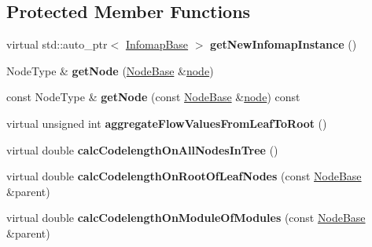 \subsection*{Protected Member Functions}
\begin{DoxyCompactItemize}
\item 
\mbox{\label{classInfomapGreedyCommon_aaaa423506d351f689fe1e2cf0092930c}} 
virtual std\+::auto\+\_\+ptr$<$ \mbox{\hyperlink{classInfomapBase}{Infomap\+Base}} $>$ {\bfseries get\+New\+Infomap\+Instance} ()
\item 
\mbox{\label{classInfomapGreedyCommon_ab6f3822e0e2a7d5bbbc00f52b2750222}} 
Node\+Type \& {\bfseries get\+Node} (\mbox{\hyperlink{classNodeBase}{Node\+Base}} \&\mbox{\hyperlink{structnode}{node}})
\item 
\mbox{\label{classInfomapGreedyCommon_a6e46fb6c7041f09993a70135e22585a7}} 
const Node\+Type \& {\bfseries get\+Node} (const \mbox{\hyperlink{classNodeBase}{Node\+Base}} \&\mbox{\hyperlink{structnode}{node}}) const
\item 
\mbox{\label{classInfomapGreedyCommon_a201b93e2f668b3f55c130c933a78e4ce}} 
virtual unsigned int {\bfseries aggregate\+Flow\+Values\+From\+Leaf\+To\+Root} ()
\item 
\mbox{\label{classInfomapGreedyCommon_a7c15dc01895797111c8b546cbc35d797}} 
virtual double {\bfseries calc\+Codelength\+On\+All\+Nodes\+In\+Tree} ()
\item 
\mbox{\label{classInfomapGreedyCommon_a16b8fb2ee1e3c5fa6bb52caba21558e7}} 
virtual double {\bfseries calc\+Codelength\+On\+Root\+Of\+Leaf\+Nodes} (const \mbox{\hyperlink{classNodeBase}{Node\+Base}} \&parent)
\item 
\mbox{\label{classInfomapGreedyCommon_ae651d281b4b98215fe2ace4c25b2ecd0}} 
virtual double {\bfseries calc\+Codelength\+On\+Module\+Of\+Modules} (const \mbox{\hyperlink{classNodeBase}{Node\+Base}} \&parent)
\item 
\mbox{\label{classInfomapGreedyCommon_a83f8c77d553b7da850ae770a3cda2ac0}} 

\end{DoxyCompactItemize}
